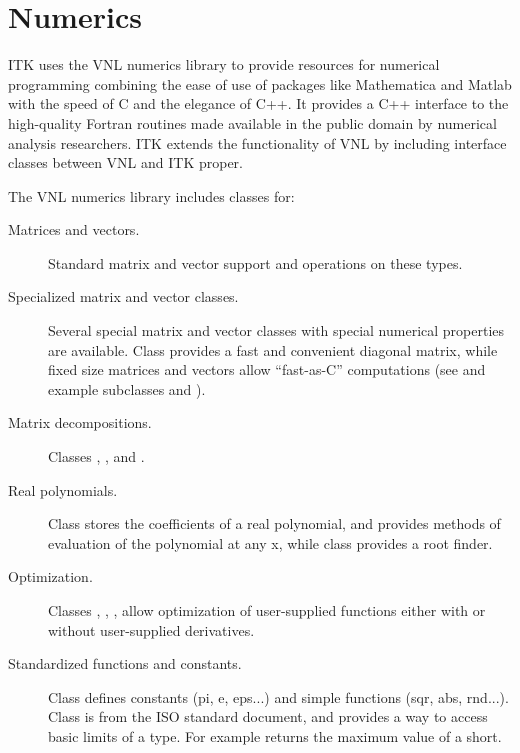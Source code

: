 \section{Numerics}
\label{sec:Numerics}


ITK uses the VNL numerics library to provide resources for numerical
programming combining the ease of use of packages like Mathematica and Matlab
with the speed of C and the elegance of C++. It provides a C++ interface to
the high-quality Fortran routines made available in the public domain by
numerical analysis researchers. ITK extends the functionality of VNL
by including interface classes between VNL and ITK proper.

The VNL numerics library includes classes for:
\begin{description}
    \item[Matrices and vectors.] Standard matrix and vector support
    and operations on these types.

    \item[Specialized matrix and vector classes.] Several special matrix
    and vector classes with special numerical properties are
    available. Class  provides a fast and
    convenient diagonal matrix, while fixed size matrices and vectors
    allow ``fast-as-C'' computations (see 
    and example subclasses  and
    ).

    \item[Matrix decompositions.] Classes ,
    , and
    .

    \item[Real polynomials.] Class  stores
    the coefficients of a real polynomial, and provides methods of
    evaluation of the polynomial at any x, while class
     provides a root finder.

    \item[Optimization.] Classes ,
    , ,
     allow optimization of user-supplied
    functions either with or without user-supplied derivatives.

    \item[Standardized functions and constants.] Class 
    defines constants (pi, e, eps...) and simple functions (sqr, abs,
    rnd...). Class  is from the ISO standard
    document, and provides a way to access basic limits of a
    type. For example  returns the maximum
    value of a short.
\end{description}


